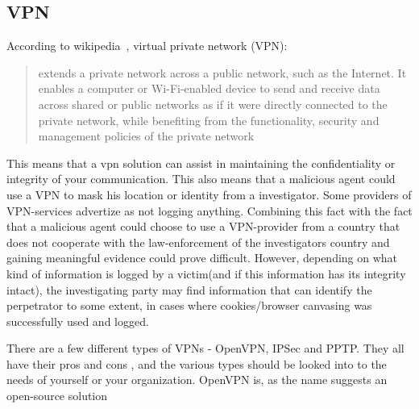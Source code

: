 \subsection{VPN}
 
According to wikipedia~\cite{wiki_vpn}, virtual private network (VPN):
\begin{quote}
extends a private network across a public network, such as the Internet. It enables a computer or Wi-Fi-enabled device to send and receive data across shared or public networks as if it were directly connected to the private network, while benefiting from the functionality, security and management policies of the private network
\end{quote}
This means that a vpn solution can assist in maintaining the confidentiality or integrity of your communication.
This also means that a malicious agent could use a VPN to mask his location or identity from a investigator. Some providers of VPN-services advertize as not logging anything. Combining this fact with the fact that a malicious agent could choose to use a VPN-provider from a country that does not cooperate with the law-enforcement of the investigators country and gaining meaningful evidence could prove difficult.
However, depending on what kind of information is logged by a victim(and if this information has its integrity intact), the investigating party may find information that can identify the perpetrator to some extent, in cases where cookies/browser canvasing was successfully used and logged.


There are a few different types of VPNs - OpenVPN, IPSec and PPTP. They all have their pros and cons , and the various types should be looked into to  the needs of yourself or your organization.
OpenVPN is, as the name suggests an open-source solution ~\cite{open_vpn_wiki}